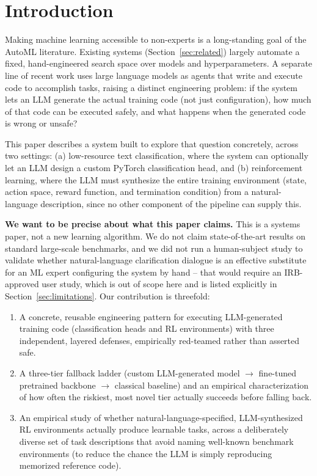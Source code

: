 \documentclass[10pt,twocolumn]{article}
\begin{document}
\section{Introduction}

Making machine learning accessible to non-experts is a long-standing goal of
the AutoML literature. Existing systems (Section~\ref{sec:related}) largely
automate a fixed, hand-engineered search space over models and
hyperparameters. A separate line of recent work uses large language models
as agents that write and execute code to accomplish tasks, raising a
distinct engineering problem: if the system lets an LLM generate the actual
training code (not just configuration), how much of that code can be
executed safely, and what happens when the generated code is wrong or
unsafe?

This paper describes a system built to explore that question concretely,
across two settings: (a) low-resource text classification, where the system
can optionally let an LLM design a custom PyTorch classification head, and
(b) reinforcement learning, where the LLM must synthesize the entire training
environment (state, action space, reward function, and termination
condition) from a natural-language description, since no other component of
the pipeline can supply this.

\textbf{We want to be precise about what this paper claims.} This is a
systems paper, not a new learning algorithm. We do not claim state-of-the-art
results on standard large-scale benchmarks, and we did not run a human-subject
study to validate whether natural-language clarification dialogue is an
effective substitute for an ML expert configuring the system by hand --
that would require an IRB-approved user study, which is out of scope here and
is listed explicitly in Section~\ref{sec:limitations}. Our contribution is
threefold:
\begin{enumerate}
  \item A concrete, reusable engineering pattern for executing LLM-generated
        training code (classification heads and RL environments) with three
        independent, layered defenses, empirically red-teamed rather than
        asserted safe.
  \item A three-tier fallback ladder (custom LLM-generated model
        $\to$ fine-tuned pretrained backbone $\to$ classical baseline) and
        an empirical characterization of how often the riskiest, most novel
        tier actually succeeds before falling back.
  \item An empirical study of whether natural-language-specified,
        LLM-synthesized RL environments actually produce learnable tasks,
        across a deliberately diverse set of task descriptions that avoid
        naming well-known benchmark environments (to reduce the chance the
        LLM is simply reproducing memorized reference code).
\end{enumerate}
\end{document}
